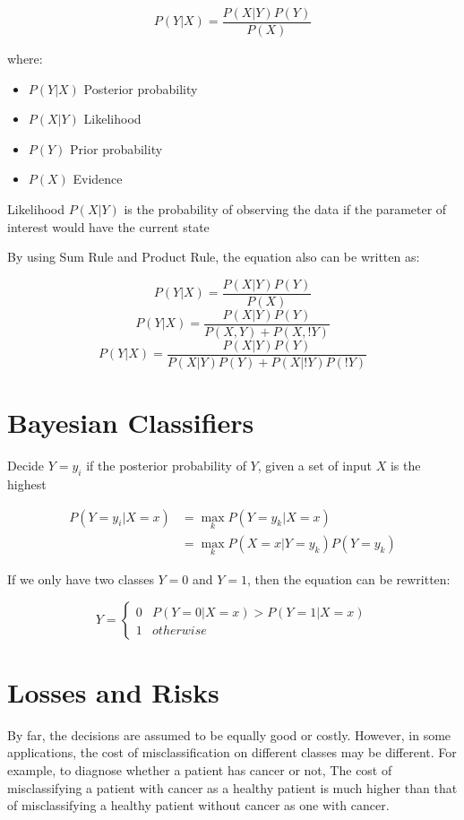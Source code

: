 \begin{multicols}{2}
$$P(Y|X)= \frac{P(X|Y) P(Y)}{P(X)}$$

\noindent where:
\begin{itemize}
    \item $P(Y|X)$ Posterior probability
    \item $P(X|Y)$ Likelihood
    \item $P(Y)$ Prior probability
    \item $P(X)$ Evidence
\end{itemize}

\noindent Likelihood $P(X|Y)$ is the probability of observing the data if the parameter of interest would have the current state

\noindent By using Sum Rule and Product Rule, the equation also can be written as:

$$P(Y|X)= \frac{P(X|Y) P(Y)}{P(X)}$$
$$P(Y|X)= \frac{P(X|Y) P(Y)}{P(X,Y)+P(X,!Y)}$$
$$P(Y|X)= \frac{P(X|Y) P(Y)}{P(X|Y)P(Y)+P(X|!Y)P(!Y)}$$

\section{Bayesian Classifiers}

\noindent Decide $Y=y_{i}$ if the posterior probability of $Y$, given a set of input $X$ is the highest

\begin{equation*}
\begin{split}
    P(Y=y_{i}|X=x) &= \!\max_{k} P(Y=y_{k}|X=x) \\
    &= \!\max_{k} P(X=x | Y = y_k) P(Y= y_k)
\end{split}
\end{equation*}

\noindent If we only have two classes $Y=0$ and $Y=1$, then the equation can be rewritten:

$$
Y = 
\begin{cases}
0 & P(Y=0|X=x) > P(Y=1|X=x)\\
1 & otherwise
\end{cases}
$$

\section{Losses and Risks}

\noindent By far, the decisions are assumed to be equally good or costly. However, in some applications, the cost of misclassification on different classes may be different. For example, to diagnose whether a patient has cancer or not, The cost of misclassifying a patient with cancer as a healthy patient is much higher than that of misclassifying a healthy patient without cancer as one with cancer.


\end{multicols}
